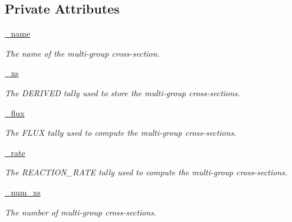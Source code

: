 \subsection*{Private Attributes}
\begin{DoxyCompactItemize}
\item 
\hypertarget{classpinspec_1_1process_1_1GroupXS_ae1ec6f536e2a123c5e050313681364ce}{\hyperlink{classpinspec_1_1process_1_1GroupXS_ae1ec6f536e2a123c5e050313681364ce}{\-\_\-name}}\label{classpinspec_1_1process_1_1GroupXS_ae1ec6f536e2a123c5e050313681364ce}

\begin{DoxyCompactList}\small\item\em The name of the multi-\/group cross-\/section. \end{DoxyCompactList}\item 
\hypertarget{classpinspec_1_1process_1_1GroupXS_ad6f901eaff624ea2d59280d198bbca09}{\hyperlink{classpinspec_1_1process_1_1GroupXS_ad6f901eaff624ea2d59280d198bbca09}{\-\_\-xs}}\label{classpinspec_1_1process_1_1GroupXS_ad6f901eaff624ea2d59280d198bbca09}

\begin{DoxyCompactList}\small\item\em The D\-E\-R\-I\-V\-E\-D tally used to store the multi-\/group cross-\/sections. \end{DoxyCompactList}\item 
\hypertarget{classpinspec_1_1process_1_1GroupXS_acc9c47ded2fb3c3e8d27b8ca1652962a}{\hyperlink{classpinspec_1_1process_1_1GroupXS_acc9c47ded2fb3c3e8d27b8ca1652962a}{\-\_\-flux}}\label{classpinspec_1_1process_1_1GroupXS_acc9c47ded2fb3c3e8d27b8ca1652962a}

\begin{DoxyCompactList}\small\item\em The F\-L\-U\-X tally used to compute the multi-\/group cross-\/sections. \end{DoxyCompactList}\item 
\hypertarget{classpinspec_1_1process_1_1GroupXS_a72b491dd81618cc213b4f397d3a73b14}{\hyperlink{classpinspec_1_1process_1_1GroupXS_a72b491dd81618cc213b4f397d3a73b14}{\-\_\-rate}}\label{classpinspec_1_1process_1_1GroupXS_a72b491dd81618cc213b4f397d3a73b14}

\begin{DoxyCompactList}\small\item\em The R\-E\-A\-C\-T\-I\-O\-N\-\_\-\-R\-A\-T\-E tally used to compute the multi-\/group cross-\/sections. \end{DoxyCompactList}\item 
\hypertarget{classpinspec_1_1process_1_1GroupXS_aec56586bd4e0a90d9d5ce97ad6c40595}{\hyperlink{classpinspec_1_1process_1_1GroupXS_aec56586bd4e0a90d9d5ce97ad6c40595}{\-\_\-num\-\_\-xs}}\label{classpinspec_1_1process_1_1GroupXS_aec56586bd4e0a90d9d5ce97ad6c40595}

\begin{DoxyCompactList}\small\item\em The number of multi-\/group cross-\/sections. \end{DoxyCompactList}\end{DoxyCompactItemize}


